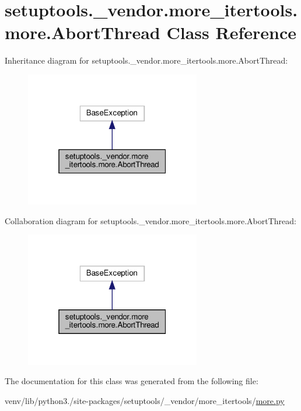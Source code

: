 \hypertarget{classsetuptools_1_1__vendor_1_1more__itertools_1_1more_1_1AbortThread}{}\section{setuptools.\+\_\+vendor.\+more\+\_\+itertools.\+more.\+Abort\+Thread Class Reference}
\label{classsetuptools_1_1__vendor_1_1more__itertools_1_1more_1_1AbortThread}


Inheritance diagram for setuptools.\+\_\+vendor.\+more\+\_\+itertools.\+more.\+Abort\+Thread\+:
\nopagebreak
\begin{figure}[H]
\begin{center}
\leavevmode
\includegraphics[width=217pt]{classsetuptools_1_1__vendor_1_1more__itertools_1_1more_1_1AbortThread__inherit__graph}
\end{center}
\end{figure}


Collaboration diagram for setuptools.\+\_\+vendor.\+more\+\_\+itertools.\+more.\+Abort\+Thread\+:
\nopagebreak
\begin{figure}[H]
\begin{center}
\leavevmode
\includegraphics[width=217pt]{classsetuptools_1_1__vendor_1_1more__itertools_1_1more_1_1AbortThread__coll__graph}
\end{center}
\end{figure}


The documentation for this class was generated from the following file\+:\begin{DoxyCompactItemize}
\item 
venv/lib/python3./site-\/packages/setuptools/\+\_\+vendor/more\+\_\+itertools/\hyperlink{more_8py}{more.\+py}\end{DoxyCompactItemize}

